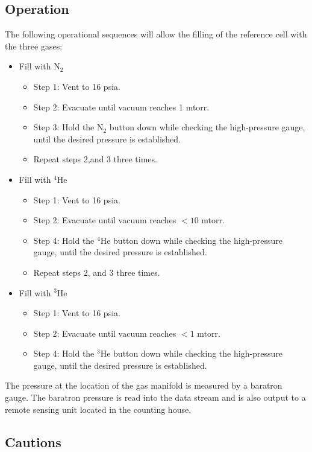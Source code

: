 {\subsection{Operation}



The following operational sequences will allow the filling of the reference cell with the three gases:

\begin{itemize}
\item Fill with N$_2$
\begin{itemize}
\item Step 1: Vent to 16 psia.
\item Step 2: Evacuate until vacuum reaches 1 mtorr.
\item Step 3: Hold the N$_2$ button down while checking the high-pressure gauge, until the desired pressure is established.
\item Repeat steps 2,and 3 three times.
\end{itemize}
\item Fill with $^4$He
\begin{itemize}
\item Step 1: Vent to 16 psia.
\item Step 2: Evacuate until vacuum reaches $< 10$ mtorr.
\item Step 4: Hold the $^4$He button down while checking the high-pressure gauge, until the desired pressure is established.
\item Repeat steps 2, and 3 three times.
\end{itemize}
\item Fill with $^3$He
\begin{itemize}
\item Step 1: Vent to 16 psia.
\item Step 2: Evacuate until vacuum reaches $< 1$ mtorr.
\item Step 4: Hold the $^3$He button down while checking the high-pressure gauge, until the desired pressure is established.
\end{itemize}
\end{itemize}




The pressure at the location of the gas
manifold is measured by a  baratron gauge.  The baratron
pressure is read into the data stream and is also output to a remote
sensing unit located in  the counting house.




\subsection{Cautions}

}

